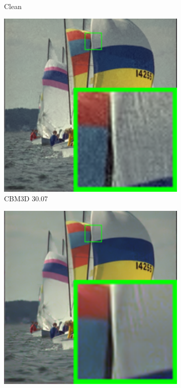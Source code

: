 \begin{figure}
\begin{subfigure}[t]{0.19\textwidth}
		\caption{Clean}
    \end{subfigure}
    \hfill
    \begin{subfigure}[t]{0.19\textwidth}
        \centering
        \includegraphics[width=1\textwidth]{images/mcwnnm/24images/resize_br_CBM3D_nSig53015_kodim09.png}
		\caption{CBM3D 30.07}
    \end{subfigure}
    \hfill
    \begin{subfigure}[t]{0.19\textwidth}
        \centering
        \includegraphics[width=1\textwidth]{images/mcwnnm/24images/resize_br_MLP_nSig53015_kodim09.png}

\end{subfigure}
\end{figure}
